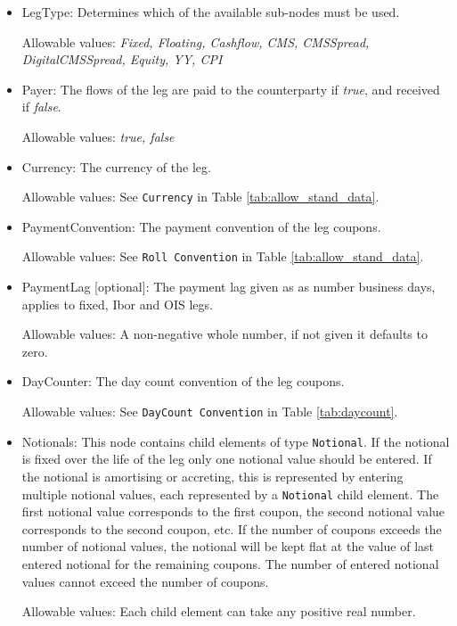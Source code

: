 \begin{itemize}
\item LegType:  Determines which of the available sub-nodes must be
  used. 

Allowable values:  \emph{Fixed, Floating, Cashflow, CMS, CMSSpread, DigitalCMSSpread, Equity, YY, CPI}

\item Payer:  The flows of the leg are paid to the counterparty if
  \emph{true}, and received if \emph{false}.  

Allowable values:  \emph{true, false} 

\item Currency: The currency of the leg. 

Allowable values:  See \lstinline!Currency! in Table \ref{tab:allow_stand_data}.

\item PaymentConvention: The payment convention of the leg coupons. 

Allowable values: See \lstinline!Roll Convention! in Table \ref{tab:allow_stand_data}.

\item PaymentLag [optional]: The payment lag given as as number business days, applies to fixed, Ibor and OIS legs.

Allowable values: A non-negative whole number, if not given it defaults to zero.

\item DayCounter: The day count convention of the leg coupons. 

Allowable values: See \lstinline!DayCount Convention! in Table \ref{tab:daycount}.

\item Notionals: This node contains child elements of type
  \lstinline!Notional!. If the notional is fixed over the life of the
  leg only one notional value should be entered. If the notional is
  amortising or accreting, this is represented by entering multiple
  notional values, each represented by a \lstinline!Notional! child
  element. The first notional value corresponds to the first coupon,
  the second notional value corresponds to the second coupon, etc. If
  the number of coupons exceeds the number of notional values, the
  notional will be kept flat at the value of last entered notional for
  the remaining coupons.  The number of entered notional values cannot
  exceed the number of coupons.

Allowable values: Each child element can take any positive real number.


\end{itemize}
